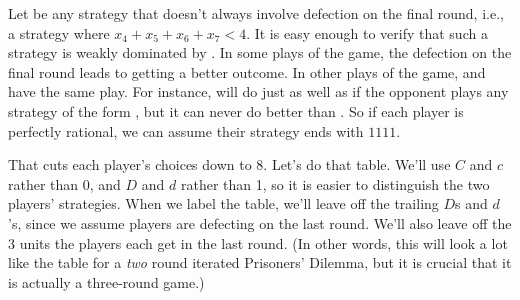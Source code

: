 \documentclass[openany]{book}
\begin{document}
Let  be any strategy that doesn't always involve defection on the final round, i.e., a strategy where $x_4 + x_5 + x_6 + x_7 < 4$. It is easy enough to verify that such a strategy is weakly dominated by . In some plays of the game, the defection on the final round leads to getting a better outcome. In other plays of the game,  and  have the same play. For instance,  will do just as well as  if the opponent plays any strategy of the form , but it can never do better than . So if each player is perfectly rational, we can assume their strategy ends with $1111$.

That cuts each player's choices down to 8. Let's do that table. We'll use $C$ and $c$ rather than 0, and $D$ and $d$ rather than 1, so it is easier to distinguish the two players' strategies. When we label the table, we'll leave off the trailing $D$s and $d$'s, since we assume players are defecting on the last round. We'll also leave off the 3 units the players each get in the last round. (In other words, this will look a lot like the table for a \textit{two} round iterated Prisoners' Dilemma, but it is crucial that it is actually a three-round game.)

\end{document}
